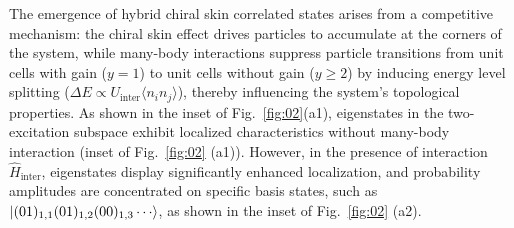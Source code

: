 \documentclass[longbibliography, aps, prx, amsmath, amssymb, amsfonts, twocolumn,superscriptaddress, footinbib]{revtex4-1}
\begin{document}



	The emergence of hybrid chiral skin correlated states arises from a competitive mechanism: the chiral skin effect drives particles to accumulate at the corners of the system, while many-body interactions suppress particle transitions from unit cells with gain ($y=1$) to unit cells without gain ($y \geq 2$) by inducing energy level splitting ($\Delta E \propto U_{\text{inter}}\langle n_i n_j \rangle$), thereby influencing the system's topological properties.
	As shown in the inset of Fig.~\ref{fig:02}(a1), eigenstates in the two-excitation subspace exhibit localized characteristics 
	without many-body interaction (inset of Fig.~\ref{fig:02} (a1)). However, in the presence of interaction $\hat{H}_{\text{inter}}$, eigenstates display significantly enhanced localization, and probability amplitudes are concentrated on specific basis states, such as $\ket{(01)_{1,1}(01)_{1,2}(00)_{1,3}\cdots}$, as shown in the inset of Fig.~\ref{fig:02} (a2). 
\end{document}
